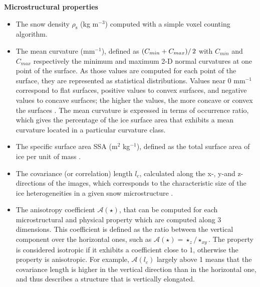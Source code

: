 \documentclass[draft,ms]{agujournal2019}
\begin{document}
\noindent \textbf{Microstructural properties} 
\begin{itemize}
    \item The snow density $\rho_{\mathrm{s}}$ (kg m$^{-3}$) computed with a simple voxel counting algorithm.
    
    \item The mean curvature (mm$^{-1}$), defined as $\left(C_{min} + C_{max})\right/2$ with $C_{min}$ and $C_{max}$ respectively the minimum and maximum 2-D normal curvatures at one point of the surface. As those values are computed for each point of the surface, they are represented as statistical distributions. Values near 0 mm$^{-1}$ correspond to flat surfaces, positive values to convex surfaces, and negative values to concave surfaces; the higher the values, the more concave or convex the surfaces \cite{ogawa2006representation}. The mean curvature is expressed in terms of occurrence ratio, which gives the percentage of the ice surface area that exhibits a mean curvature located in a particular curvature class.
    
    \item The specific surface area SSA (m$^2$ kg$^{-1}$), defined as the total surface area of ice per unit of mass \cite{dumont2021experimental, flin2011computations}.
    
    \item The covariance (or correlation) length $l_{c}$, calculated along the x-, y-and z- directions of the images,  which corresponds to the characteristic size of the ice heterogeneities in a given snow microstructure \cite{lowe2013general}. 
    
    \item The anisotropy coefficient
    $\mathcal{A}(\star)$, that can be computed for each microstructural and physical property which are computed along 3 dimensions. This coefficient is defined as the ratio between the vertical component over the horizontal ones, such as $\mathcal{A}(\star)=\star_{z} / \star_{x y}$. The property is considered isotropic if it exhibits a coefficient close to 1, otherwise the property is anisotropic. For example, $\mathcal{A}(l_c)$ largely above 1 means that the covariance length is higher in the vertical direction than in the horizontal one, and thus describes a structure that is vertically elongated.
\end{itemize}
\end{document}
